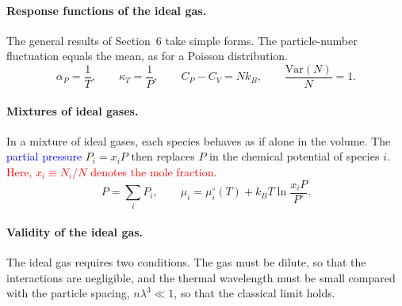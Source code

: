 \paragraph{Response functions of the ideal gas.}
The general results of Section~6 take simple forms. The particle-number
fluctuation equals the mean, as for a Poisson distribution.
\begin{equation}
    \boxed{\alpha_P=\frac{1}{T},\qquad\kappa_T=\frac{1}{P},\qquad
    C_P-C_V=Nk_B,\qquad\frac{\mathrm{Var}(N)}{N}=1.}
\end{equation}

\paragraph{Mixtures of ideal gases.}
In a mixture of ideal gases, each species behaves as if alone in the
volume. The \textcolor{blue}{partial pressure} $P_i=x_iP$ then replaces $P$
in the chemical potential of species $i$.
\textcolor{red}{Here, $x_i\equiv N_i/N$ denotes the mole fraction.}
\begin{equation}
    \boxed{P=\sum_iP_i,\qquad
    \mu_i=\mu_i^\circ(T)+k_BT\ln\frac{x_iP}{P^\circ}.}
\end{equation}

\paragraph{Validity of the ideal gas.}
The ideal gas requires two conditions. The gas must be dilute, so that the
interactions are negligible, and the thermal wavelength must be small
compared with the particle spacing, $n\lambda^3\ll1$, so that the classical
limit holds.
